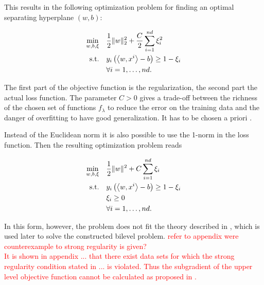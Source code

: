 This results in the following optimization problem for finding an optimal separating hyperplane \((w,b)\): 


%
\begin{align}
\begin{split}
	\min_{w,b,\xi} \quad & \frac{1}{2} \|w\|^2_2+\frac{C}{2}\sum_{i=1}^{nd}{\xi_i^2} \vspace{0.5ex}\\
	\text{s.t.} \quad & y_i\left(\Langle w,x^i\Rangle-b\right) \geq 1 - \xi_i \vspace{0.5ex}\\
	& 	\forall i = 1, \dots , nd.
\end{split}
\label{SVM_2}
\end{align}

The first part of the objective function is the regularization, the second part the actual loss function. 
The parameter \(C > 0\) gives a trade-off between the richness of the chosen set of functions \(f_{\lambda}\) to reduce the error on the training data and the danger of overfitting to have good generalization. It has to be chosen a priori \cite{Kunapuli2008}.

Instead of the Euclidean norm it is also possible to use the 1-norm in the loss function. Then the resulting optimization problem reads

\begin{align*}
\begin{split}
	\min_{w,b,\xi} \quad & \frac{1}{2} \|w\|^2+C\sum_{i=1}^{nd}{\xi_i} \\
	\text{s.t.} \quad & y_i\left(\left\langle w,x^i\right\rangle-b\right) \geq 1 - \xi_i \\
	& \xi_i \geq 0 \\
	& 	\forall i = 1, \dots , nd.
\end{split}
\end{align*}

In this form, however, the problem does not fit the theory described in \cite{Outrata1998}, which is used later to solve the constructed bilevel problem. \textcolor{red}{refer to appendix were counterexample to strong regularity is given?\\
It is shown in appendix ... that there exist data sets for which the strong regularity condition stated in ... is violated. Thus the subgradient of the upper level objective function cannot be calculated as proposed in \cite{Outrata1998}.}


